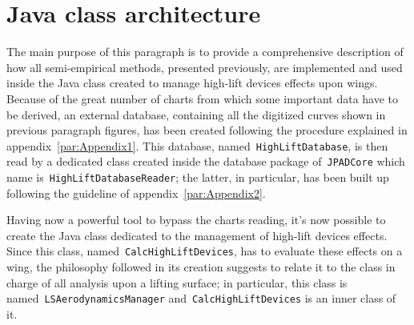 \section{Java class architecture}
\label{par:CalcHighLiftDevices}
The main purpose of this paragraph is to provide a comprehensive description of how all semi-empirical methods, presented previously, are implemented and used inside the Java class created to manage high-lift devices effects upon wings. Because of the great number of charts from which some important data have to be derived, an external database, containing all the digitized curves shown in previous paragraph figures, has been created following the procedure explained in appendix~\ref{par:Appendix1}. This database, named~\lstinline[language=Java]!HighLiftDatabase!, is then read by a dedicated class created inside the database package of~\lstinline[language=Java]!JPADCore! which name is~\lstinline[language=Java]!HighLiftDatabaseReader!; the latter, in particular, has been built up following the guideline of appendix~\ref{par:Appendix2}.

\bigskip
\noindent
Having now a powerful tool to bypass the charts reading, it's now possible to create the Java class dedicated to the management of high-lift devices effects. Since this class, named~\lstinline[language=Java]!CalcHighLiftDevices!, has to evaluate these effects on a wing, the philosophy followed in its creation suggests to relate it to the class in charge of all analysis upon a lifting surface; in particular, this class is named~\lstinline[language=Java]!LSAerodynamicsManager! and~\lstinline[language=Java]!CalcHighLiftDevices! is an inner class of it.


